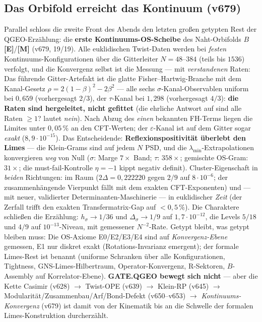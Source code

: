 \documentclass[11pt,a4paper]{article}
\newcommand{\E}{\textcolor{gut}{\textbf{[E]}}}
\newcommand{\M}{\textcolor{mess}{\textbf{[M]}}}
\begin{document}
\subsection*{Das Orbifold erreicht das Kontinuum (v679)}

Parallel schloss die zweite Front des Abends den letzten großen
getypten Rest der QGEO-Erzählung: die \textbf{erste
Kontinuums-OS-Scheibe} des Naht-Orbifolds $B$ \E{}/\M{} (v679,
19/19). Alle euklidischen Twist-Daten werden bei \emph{festen}
Kontinuums-Konfigurationen über die Gitterleiter $N = 48$--$384$
(teils bis $1536$) verfolgt, und die Konvergenz selbst ist die
Messung --- mit \emph{verstandenen} Raten: Das führende
Gitter-Artefakt ist die glatte Fisher--Hartwig-Branche mit dem
Kanal-Gesetz $\rho = 2(1-\beta)^2 - 2\beta^2$ --- alle sechs
$\sigma$-Kanal-Observablen uniform bei $0{,}659$ (vorhergesagt
$2/3$), der $\tau$-Kanal bei $1{,}298$ (vorhergesagt $4/3$):
\textbf{die Raten sind hergeleitet, nicht gefittet} (die ehrliche
Antwort auf \glqq{}sind alle Raten $\ge 1$?\grqq{} lautet
\emph{nein}). Nach Abzug des \emph{einen} bekannten FH-Terms liegen
die Limites unter $0{,}05\,\%$ an den CFT-Werten; der
$\varepsilon$-Kanal ist auf dem Gitter sogar \emph{exakt}
($8{,}9 \cdot 10^{-15}$). Das Entscheidende:
\textbf{Reflexionspositivität überlebt den Limes} --- die
Klein-Grams sind auf jedem $N$ PSD, und die
$\lambda_{\min}$-Extrapolationen konvergieren \emph{weg} von Null
($\sigma$: Marge $7\times$ Band; $\tau$: $358\times$; gemischte
OS-Gram: $31\times$; die must-fail-Kontrolle $\eta = -1$ kippt
negativ definit). Cluster-Eigenschaft in \emph{beiden} Richtungen:
im Raum ($2\Delta = 0{,}222220$ gegen $2/9$ auf $8 \cdot 10^{-6}$;
der zusammenhängende Vierpunkt fällt mit dem exakten
CFT-Exponenten) und --- mit neuer, validierter
Determinanten-Maschinerie --- in euklidischer \emph{Zeit} (der
Zerfall trifft den exakten Transfermatrix-Gap auf $< 0{,}5\,\%$).
Die Charaktere schließen die Erzählung: $h_\sigma \to 1/36$ und
$\Delta_\sigma \to 1/9$ auf $1{,}7 \cdot 10^{-12}$, die Levels
$5/18$ und $4/9$ auf $10^{-13}$-Niveau, mit gemessener
$N^{-2}$-Rate. Getypt bleibt, was getypt bleiben muss: Die
OS-Axiome E0/E2/E3/E4 sind auf \emph{Konvergenz-Ebene} gemessen,
E1 nur diskret exakt (Rotations-Invarianz emergent); der formale
Limes-Rest ist benannt (uniforme Schranken über alle
Konfigurationen, Tightness, GNS-Limes-Hilbertraum,
Operator-Konvergenz, R-Sektoren, $B$-Assembly auf
Korrelator-Ebene). \textbf{GATE.QGEO bewegt sich nicht} --- aber
die Kette Casimir (v628) $\to$ Twist-OPE (v639) $\to$ Klein-RP
(v645) $\to$ Modularität/Zusammenbau/Arf/Bond-Defekt (v650--v653)
$\to$ \emph{Kontinuums-Konvergenz} (v679) ist damit von der
Kinematik bis an die Schwelle der formalen Limes-Konstruktion
durcherzählt.
\end{document}
